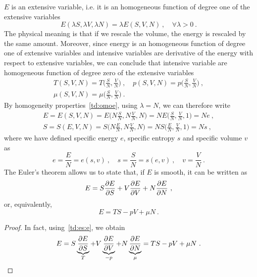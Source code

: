     $E$ is an extensive variable, i.e. it is an homogeneous function of degree one of the extensive variables 
    \begin{equation}\label{td:omoe}
        E(\lambda S, \lambda V, \lambda N) = \lambda E(S, V, N) ~, \quad \forall \lambda > 0 ~.
    \end{equation}
    The physical meaning is that if we rescale the volume, the energy is rescaled by the same amount. Moreover, since energy is an homogeneous function of degree one of extensive variables and intensive variables are derivative of the energy with respect to extensive variables, we can conclude that intensive variable are homogeneous function of degree zero of the extensive variables 
    \begin{equation}\label{a5}
    \begin{gathered}
        T(S, V, N) = T \Big(\frac{S}{N}, \frac{V}{N} \Big) ~, \quad p(S, V, N) = p \Big (\frac{S}{N}, \frac{V}{N} \Big) ~, \\ \mu(S, V, N) = \mu \Big(\frac{S}{N}, \frac{V}{N} \Big) ~.
    \end{gathered}
    \end{equation}
    By homogeneity properties~\eqref{td:omoe}, using $\lambda = N$, we can therefore write
    \begin{equation*}
    \begin{gathered}
        E = E(S, V, N) = E \Big(N \frac{S}{N}, N \frac{V}{N}, N \Big) = N E \Big(\frac{S}{N}, \frac{V}{N}, 1 \Big) = N e ~, \\  S = S(E, V, N) = S \Big(N \frac{E}{N}, N \frac{V}{N}, N \Big) = N S \Big(\frac{E}{N}, \frac{V}{N}, 1 \Big) = N s ~,
    \end{gathered}
    \end{equation*}
    where we have defined specific energy $e$, specific entropy $s$ and specific volume $v$ as
    \begin{equation*}
        e = \frac{E}{N} = e(s, v) ~, \quad s = \frac{S}{N} = s(e, v) ~, \quad v = \frac{V}{N} ~.
    \end{equation*}
    The Euler's theorem allows us to state that, if $E$ is smooth, it can be written as 
    \begin{equation*}
        E = S \frac{\partial E}{\partial S} + V \frac{\partial E}{\partial V} + N \frac{\partial E}{\partial N} ~,
    \end{equation*}
    or, equivalently, 
    \begin{equation}\label{td:e}
        E = TS - pV + \mu N ~.
    \end{equation}
    \begin{proof}
        In fact, using~\eqref{td:es:e}, we obtain
        \begin{equation*}
            E = S \underbrace{\frac{\partial E}{\partial S}}_T + V \underbrace{\frac{\partial E}{\partial V}}_{-p} + N \underbrace{\frac{\partial E}{\partial N}}_\mu = TS - pV + \mu N ~.
        \end{equation*}
    \end{proof}

